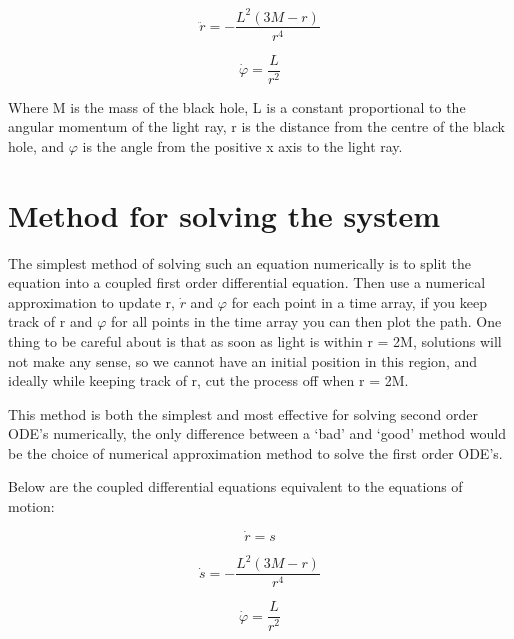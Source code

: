 \documentclass[oneside,openright,frontopenright]{dmathesis}
\begin{document}
	\[\ddot{r}=-\frac{L^2(3M-r)}{r^4}\]

	\[\dot{\varphi}=\frac{L}{r^2}\]


	Where M is the mass of the black hole, L is a constant proportional to the angular momentum of the light ray, r is the distance from the centre of the black hole, and $\varphi$ is the angle from the positive x axis to the light ray.

\section{Method for solving the system}
	The simplest method of solving such an equation numerically is to split the equation into a coupled first order differential equation. Then use a numerical approximation to update r, $\dot{r}$ and $\varphi$ for each point in a time array, if you keep track of r and $\varphi$ for all points in the time array you can then plot the path. One thing to be careful about is that as soon as light is within r = 2M, solutions will not make any sense, so we cannot have an initial position in this region, and ideally while keeping track of r, cut the process off when r = 2M.

	This method is both the simplest and most effective for solving second order ODE’s numerically, the only difference between a ‘bad’ and ‘good’ method would be the choice of numerical approximation method to solve the first order ODE’s.

	Below are the coupled differential equations equivalent to the equations of motion:

	\[\dot{r}= s\]

	\[\dot{s}=-\frac{L^2(3M-r)}{r^4}\]

	\[\dot{\varphi}=\frac{L}{r^2}\]
\end{document}
